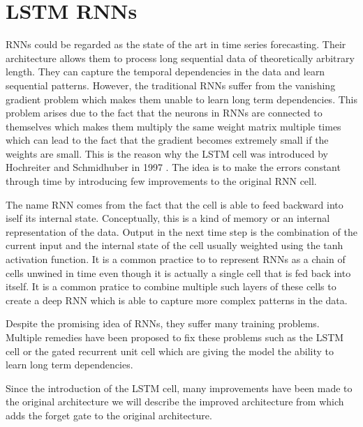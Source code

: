 \section{\acl{LSTM} \acl{RNN}s}

\acl{RNN}s could be regarded as the state of the art in time series forecasting.
Their architecture allows them to process long sequential data
of theoretically arbitrary length. They can capture the temporal dependencies
in the data and learn sequential patterns. However, the traditional \ac{RNN}s
suffer from the vanishing gradient problem which makes them unable to learn 
long term dependencies. This problem arises
due to the fact that the neurons in \ac{RNN}s are connected to themselves
which makes them multiply the same weight matrix multiple
times which can lead to the fact that the gradient becomes extremely small if the 
weights are small. This is the reason why the \ac{LSTM} cell was
introduced by Hochreiter and Schmidhuber in 1997 \cite{Hochreiter1997}.
The idea is to make the errors constant through time by introducing few improvements
to the original \ac{RNN} cell.


The name \acl{RNN} comes from the fact that the cell is able
to feed backward into iself its internal state. Conceptually, this is a kind
of memory or an internal representation of the data. Output in the next
time step is the combination of the current input and the internal state
of the cell usually weighted using the tanh activation function. 
It is a common practice to to represent \ac{RNN}s as a chain of cells 
unwined in time even though it is actually a single cell that is fed back into itself.
It is a common pratice to combine multiple such layers of these cells to create
a deep \ac{RNN} which is able to capture more complex patterns in the data.


Despite the promising idea of \ac{RNN}s, they suffer many training problems.
Multiple remedies have been proposed to fix these problems such as the \ac{LSTM} cell
or the gated recurrent unit cell which are giving the model the ability to learn
long term dependencies.

Since the introduction of the \ac{LSTM} cell, many improvements have been made to the original
architecture we will describe the improved architecture from \cite{Gers2000} which
adds the forget gate to the original architecture. 


